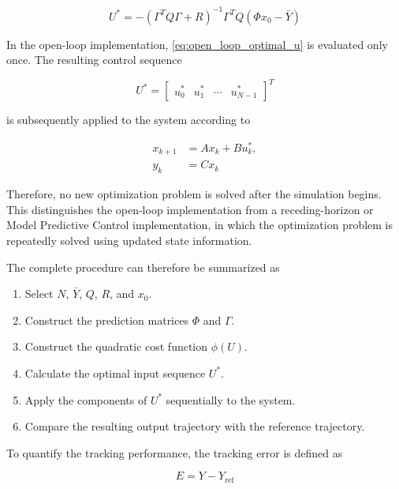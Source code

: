 \begin{equation}
    U^\ast
    =
    -
    \left(
        \Gamma^TQ\Gamma+R
    \right)^{-1}
    \Gamma^TQ
    \left(
        \Phi x_0-\bar{Y}
    \right)
    \label{eq:open_loop_optimal_u}
\end{equation}

In the open-loop implementation, \cref{eq:open_loop_optimal_u} is evaluated only once. The resulting control sequence

\begin{equation}
    U^\ast =
    \begin{bmatrix}
        u_0^\ast &
        u_1^\ast &
        \cdots &
        u_{N-1}^\ast
    \end{bmatrix}^T
\end{equation}

is subsequently applied to the system according to

\begin{align}
    x_{k+1} &= Ax_k + Bu_k^\ast, \\
    y_k &= Cx_k
\end{align}

Therefore, no new optimization problem is solved after the simulation begins. This distinguishes the open-loop implementation from a receding-horizon or Model Predictive Control implementation, in which the optimization problem is repeatedly solved using updated state information.

The complete procedure can therefore be summarized as

\begin{enumerate}
    \item Select \(N\), \(\bar{Y}\), \(Q\), \(R\), and \(x_0\).
    \item Construct the prediction matrices \(\Phi\) and \(\Gamma\).
    \item Construct the quadratic cost function \(\phi(U)\).
    \item Calculate the optimal input sequence \(U^\ast\).
    \item Apply the components of \(U^\ast\) sequentially to the system.
    \item Compare the resulting output trajectory with the reference trajectory.
\end{enumerate}

To quantify the tracking performance, the tracking error is defined as

\begin{equation}
    E = Y-Y_{\mathrm{ref}}
\end{equation}

